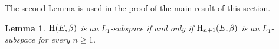 \documentclass{article}[1100]
\newtheorem{lemma}[theorem]{Lemma}
\theoremstyle{definition}
\theoremstyle{remark}
\newcommand\mySpaceH[1]{\textsc{H}(#1)}
\newcommand\mySpace[2]{\textsc{H}_{#1}(#2)}
\begin{document}

The second Lemma is used in the proof of the main result of this section.
\begin{tcolorbox}
\begin{lemma} \label{subspaceLemma}
$\mySpaceH{E,\beta}$ is an {$L_1$-subspace} if and only if $\mySpace{n+1}{E,\beta}$ is
an {$L_1$-subspace} for every $n\geq 1$.
\end{lemma}
\end{tcolorbox}
\end{document}
